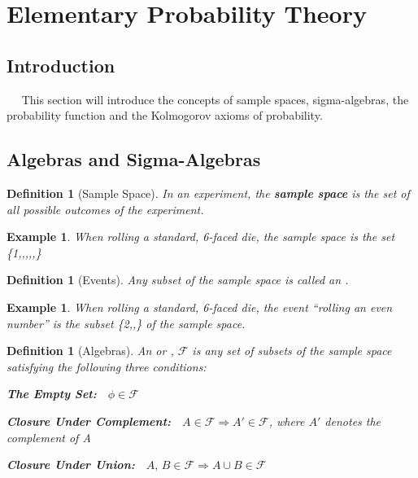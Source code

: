 \documentclass[12pt,a4paper]{article}
\newtheorem{defn}[thm]{Definition}
\newtheorem{ex}[thm]{Example}
\newcommand{\uline}[1]{\underline{\smash{#1}}}
\begin{document}
\clearpage
\section{Elementary Probability Theory}

\subsection{Introduction}

$\quad$ This section will introduce the concepts of sample spaces, sigma-algebras, the probability function and the Kolmogorov axioms of probability.
\vspace{12pt}


\subsection{Algebras and Sigma-Algebras}

\begin{defn}[Sample Space]

In an experiment, the \textbf{sample space} is the set of all possible outcomes of the experiment.\end{defn}

\begin{ex}

When rolling a standard, 6-faced die, the sample space is the set \{1,,,,,\}\end{ex}

\begin{defn}[Events]

Any subset of the sample space is called an \uline{event}.\end{defn}

\begin{ex}

When rolling a standard, 6-faced die, the event ``rolling an even number'' is the subset \{2,,\} of the sample space.\end{ex}

\begin{defn}[Algebras]

An \uline{algebra} or \uline{field}, $\mathcal{F}$ is any set of subsets of the sample space satisfying the following three conditions:\par
\vspace{10pt}
\textbf{The Empty Set:}$\quad\phi\in\mathcal{F}$\par
\vspace{10pt}
\textbf{Closure Under Complement:}$\quad A\in\mathcal{F}\Rightarrow A'\in\mathcal{F}$, where $A'$ denotes the complement of A\par
\vspace{10pt}
\textbf{Closure Under Union:}$\quad A,\,B\in\mathcal{F}\Rightarrow A\cup B\in\mathcal{F}$\par
\vspace{12pt}
\end{defn}
\end{document}
